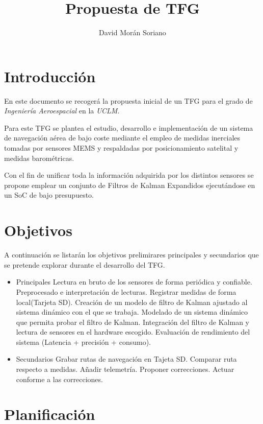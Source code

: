 \documentclass{sty/propuesta}
\title{Propuesta de TFG}
\author{David Morán Soriano}
\begin{document}
\maketitle
\tableofcontents
\newpage

\section{Introducción}
En este documento se recogerá la propuesta inicial de un TFG para el grado de \emph{Ingeniería Aeroespacial} en la \emph{UCLM}.

Para este TFG se plantea el estudio, desarrollo e implementación de un sistema de navegación aérea de bajo coste mediante el empleo de medidas inerciales tomadas por sensores MEMS y respaldadas por posicionamiento satelital y medidas barométricas.

Con el fin de unificar toda la información adquirida por los distintos sensores se propone emplear un conjunto de Filtros de Kalman Expandidos ejecutándose en un SoC de bajo presupuesto.


\section{Objetivos}
A continuación se listarán los objetivos prelimirares principales y secundarios que se pretende explorar durante el desarrollo del TFG.
\begin{itemize}
    \item Principales
        \subitem Lectura en bruto de los sensores de forma periódica y confiable.
        \subitem Preprocesado e interpretación de lecturas.
        \subitem Registrar medidas de forma local(Tarjeta SD).
        \subitem Creación de un modelo de filtro de Kalman ajustado al sistema dinámico con el que se trabaja.
        \subitem Modelado de un sistema dinámico que permita probar el filtro de Kalman.
        \subitem Integración del filtro de Kalman y lectura de sensores en el hardware escogido.
        \subitem Evaluación de rendimiento del sistema (Latencia + precisión + consumo).

    \item Secundarios
        \subitem Grabar rutas de navegación en Tajeta SD.
        \subitem Comparar ruta respecto a medidas.
        \subitem Añadir telemetría.
        \subitem Proponer correcciones.
        \subitem Actuar conforme a las correcciones.
\end{itemize}

\section{Planificación}
\end{document}
